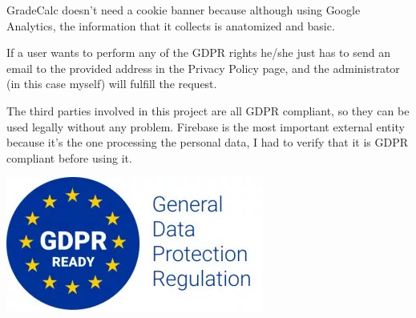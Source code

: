 GradeCalc doesn't need a cookie banner because although using Google Analytics, the information that it collects is anatomized and basic.

If a user wants to perform any of the GDPR rights he/she just has to send an email to the provided address in the Privacy Policy page, and the administrator (in this case myself) will fulfill the request.

The third parties involved in this project are all GDPR compliant, so they can be used legally without any problem. Firebase is the most important external entity because it's the one processing the personal data, I had to verify that it is GDPR compliant\cite{firebase-gdpr} before using it.

\vspace*{\fill}
\begin{center}
    \includegraphics[height=8\fontcharht\font`\X]{media/gdpr.png}
\end{center}
\vspace*{\fill}